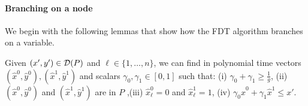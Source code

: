 \paragraph{Branching on a node}
We begin with the following lemmas that show how the FDT algorithm branches on a variable.
\begin{lemma}\label{LPClemma}
	Given $(x',y')\in \operatorname{\mathcal{D}}(P)$ and $\ell\in \{1,\ldots,n\}$, we can find in polynomial time vectors $(\hat{x}^0,\hat{y}^0),(\hat{x}^1,\hat{y}^1)$ and scalars $\gamma_0,\gamma_1 \in [0,1]$ such that: (i) $\gamma_0 + \gamma_1  \geq \frac{ 1}{g}$, (ii) $(\hat{x}^0,\hat{y}^0)$ and $(\hat{x}^1,\hat{y}^1)$ are in  $ P$
		,(iii) $\hat{x}^0_\ell=0$ and $\hat{x}^1_\ell=1$, (iv) $\gamma_0 \hat{x}^0 + \gamma_1\hat{x}^1 \leq x'$.
\end{lemma}


